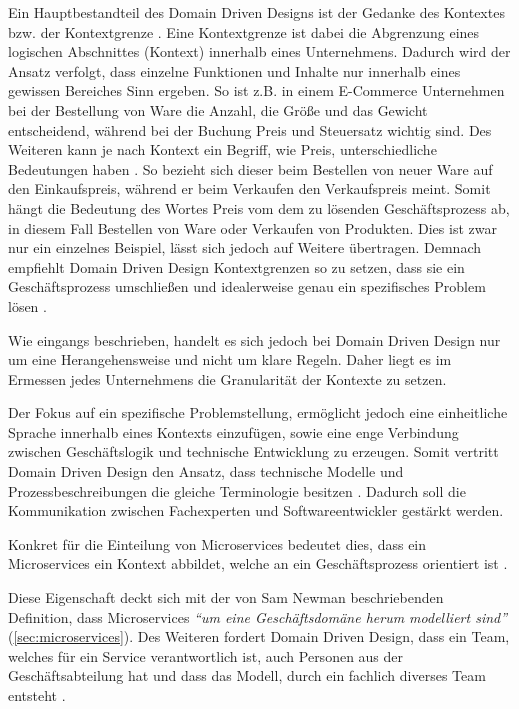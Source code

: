Ein Hauptbestandteil des Domain Driven Designs ist der Gedanke des Kontextes bzw. der Kontextgrenze \parencite[vgl.][]{fowler_boundedContext_2014}. Eine Kontextgrenze ist dabei die Abgrenzung eines logischen Abschnittes (Kontext) innerhalb eines Unternehmens. Dadurch wird der Ansatz verfolgt, dass einzelne Funktionen und Inhalte nur innerhalb eines gewissen Bereiches Sinn ergeben. So ist z.B. in einem E-Commerce Unternehmen bei der Bestellung von Ware die Anzahl, die Größe und das Gewicht entscheidend, während bei der Buchung Preis und Steuersatz wichtig sind. Des Weiteren kann je nach Kontext ein Begriff, wie Preis, unterschiedliche Bedeutungen haben \parencite[vgl.][S. 24 ff.]{evans_domain-driven_2003}. So bezieht sich dieser beim Bestellen von neuer Ware auf den Einkaufspreis, während er beim Verkaufen den Verkaufspreis meint. Somit hängt die Bedeutung des Wortes Preis vom dem zu lösenden Geschäftsprozess ab, in diesem Fall Bestellen von Ware oder Verkaufen von Produkten. Dies ist zwar nur ein einzelnes Beispiel, lässt sich jedoch auf Weitere übertragen. Demnach empfiehlt Domain Driven Design Kontextgrenzen so zu setzen, dass sie ein Geschäftsprozess umschließen und idealerweise genau ein spezifisches Problem lösen \parencite[vgl.][Kap. 4.3]{wolff_microservices_2018}.


Wie eingangs beschrieben, handelt es sich jedoch bei Domain Driven Design nur um eine Herangehensweise und nicht um klare Regeln. Daher liegt es im Ermessen jedes Unternehmens die Granularität der Kontexte zu setzen.

Der Fokus auf ein spezifische Problemstellung, ermöglicht jedoch eine einheitliche Sprache innerhalb eines Kontexts einzufügen, sowie eine enge Verbindung zwischen Geschäftslogik und technische Entwicklung zu erzeugen. Somit vertritt Domain Driven Design den Ansatz, dass technische Modelle und Prozessbeschreibungen die gleiche Terminologie besitzen \parencite[vgl.][S. 24 ff.]{evans_domain-driven_2003}. Dadurch soll die Kommunikation zwischen Fachexperten und Softwareentwickler gestärkt werden.

Konkret für die Einteilung von Microservices bedeutet dies, dass ein Microservices ein Kontext abbildet, welche an ein Geschäftsprozess orientiert ist \parencites[vgl.][Kap. 4.3]{wolff_microservices_2018}[vgl.][Kap. 4]{newman_monolith_2019}.

Diese Eigenschaft deckt sich mit der von Sam Newman beschriebenden Definition, dass Microservices \textit{\enquote{um eine Geschäftsdomäne herum modelliert sind}} (\cref{sec:microservices}). Des Weiteren fordert Domain Driven Design, dass ein Team, welches für ein Service verantwortlich ist, auch Personen aus der Geschäftsabteilung hat und dass das Modell, durch ein fachlich diverses Team entsteht \parencite[vgl.][S. 32 ff.]{evans_domain-driven_2003}. 

